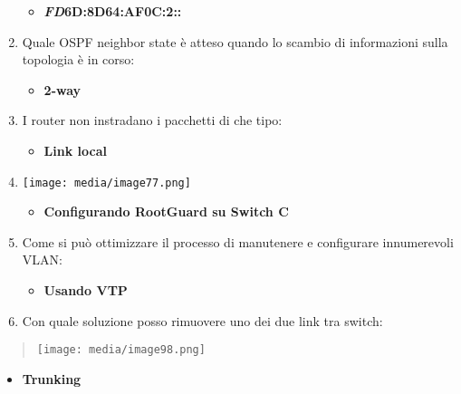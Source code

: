 \begin{enumerate}
  \begin{itemize}
  \item
    \textbf{\emph{FD}6D:8D64:AF0C:2::}
  \end{itemize}
\item
  Quale OSPF neighbor state è atteso quando lo scambio di informazioni
  sulla topologia è in corso:

  \begin{itemize}
  \item
    \textbf{2-way}
  \end{itemize}
\item
  I router non instradano i pacchetti di che tipo:

  \begin{itemize}
  \item
    \textbf{Link local}
  \end{itemize}
\item
  \texttt{[image: media/image77.png]}

  \begin{itemize}
  \item
    \textbf{Configurando RootGuard su Switch C}
  \end{itemize}
\item
  Come si può ottimizzare il processo di manutenere e configurare
  innumerevoli VLAN:

  \begin{itemize}
  \item
    \textbf{Usando VTP}
  \end{itemize}
\item
  Con quale soluzione posso rimuovere uno dei due link tra switch:
\end{enumerate}

\begin{quote}
\texttt{[image: media/image98.png]}
\end{quote}

\begin{itemize}
\item
  \textbf{Trunking}
\end{itemize}

